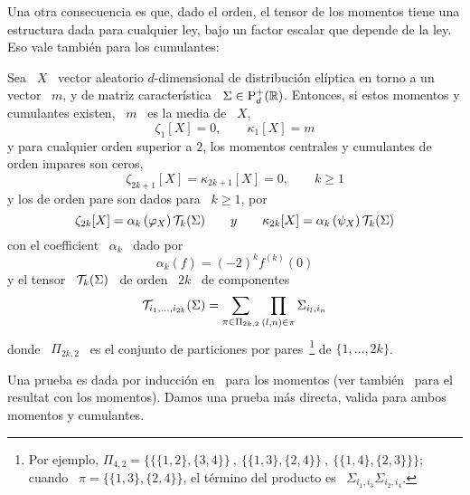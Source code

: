 Una otra consecuencia es que, dado el orden, el tensor de los momentos tiene una
estructura dada  para cualquier ley,  bajo un factor  escalar que depende  de la
ley.  Eso vale tambi\'en para los cumulantes:
%
\begin{teorema}
\label{Teo:MP:MomentosCumulantesEliptica}
%
  Sea \ $X$  \ vector aleatorio $d$-dimensional de  distribuci\'on el\'iptica en
  torno  a  un  vector  \  $m$,  y de  matriz  caracter\'istica  \  $\Sigma  \in
  \mathrm{P}_d^+(\mathbb{R})$.  Entonces, si  estos momentos y cumulantes existen,  \ $m$ \
  es la media de \ $X$, \ie
  \[
  \zeta_1[X] = 0, \qquad \kappa_1[X] = m
  \]
  y para cualquier orden superior a  $2$, los momentos centrales y cumulantes de
  orden impares son ceros,
  \[
  \zeta_{2 k + 1}[X] = \kappa_{2 k + 1}[X] = 0, \qquad k \ge 1
  \]
  y los de orden pare son dados para \ $k \ge 1$, por
  \[
  \zeta_{2 k}[X] = \alpha_k\left( \varphi_X \right) \mathcal{T}_k(\Sigma) \qquad y \qquad
  \kappa_{2 k}[X] = \alpha_k\left( \psi_X \right) \mathcal{T}_k(\Sigma)
  \]
  con el coefficient \ $\alpha_k$ \ dado por
  \[
  \alpha_k(f) = (-2)^k f^{(k)}(0)
  \]
  y el tensor \ $\mathcal{T}_k(\Sigma)$ \ de orden \ $2 k$ \ de componentes
  \[
  \mathcal{T}_{i_1,\ldots,i_{2k}}(\Sigma) = \sum_{\pi \in \Pi_{2 k , 2}} \prod_{(l,n) \in
    \pi} \Sigma_{i_l,i_n}
  \]
  donde   \  $\Pi_{2   k  ,   2}$   \  es   el  conjunto   de  particiones   por
  pares~\footnote{Por  ejemplo, $\Pi_{4,2}  =  \Big\{ \big\{  \{1,2\} ,  \{3,4\}
    \big\} \:  , \: \big\{  \{1,3\} ,  \{2,4\} \big\} \:  , \: \big\{  \{1,4\} ,
    \{2,3\} \big\} \big\}$; cuando \ $\pi = \big\{ \{1,3\} , \{2,4\} \Big\}$, el
    t\'ermino del producto es \ $\Sigma_{i_1,i_3} \Sigma_{i_2,i_4}$.} de $\{ 1 ,
  \ldots , 2 k \}$.
\end{teorema}
%
Una prueba  es dada  por inducci\'on en~\cite{BerBen86}  para los  momentos (ver
tambi\'en~\cite[p.~44]{FanKot90} para el resultat  con los momentos).  Damos una
prueba m\'as directa, valida para ambos momentos y cumulantes.
%
